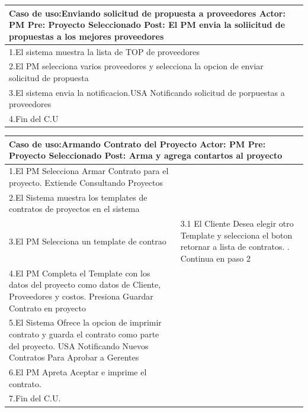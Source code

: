 \begin{longtable}{|p{}|p{}|}
    \hline
    \multicolumn{2}{|p{16cm}|}{
        \textbf{Caso de uso:}Enviando solicitud de propuesta a proveedores\newline
        \textbf{Actor:} PM\newline
        \textbf{Pre: }Proyecto Seleccionado\newline
        \textbf{Post:} El PM envia la soliicitud de propuestas a los mejores proveedores
    }\\
    \hline
    1.El sistema muestra la lista de TOP de proveedores & \\
    \hline
    2.El PM selecciona varios proveedores y selecciona la opcion de enviar solicitud de propuesta& \\
    \hline
    3.El sistema envia la notificacion.USA Notificando solicitud de porpuestas a proveedores& \\
    \hline
    4.Fin del C.U&\\
    \hline
\end{longtable}

\begin{longtable}{|p{}|p{}|}
    \hline
    \multicolumn{2}{|p{16cm}|}{
        \textbf{Caso de uso:}Armando Contrato del Proyecto \newline
        \textbf{Actor:} PM\newline
        \textbf{Pre: }Proyecto Seleccionado\newline
        \textbf{Post:} Arma y agrega contartos al proyecto
    }\\
    \hline
    1.El PM Selecciona Armar Contrato para el proyecto. Extiende Consultando Proyectos & \\
    \hline
    2.El Sistema muestra los templates de contratos de proyectos en el sistema& \\
    \hline
    3.El PM Selecciona un template de contrao& 3.1 El Cliente Desea elegir otro Template y selecciona el boton retornar a lista de contratos. \newline 3.2. Continua en paso 2 \\
    \hline
    4.El PM Completa el Template con los datos del proyecto como datos de Cliente, Proveedores y costos. Presiona Guardar Contrato en proyecto&\\
    \hline
    5.El Sistema Ofrece la opcion de imprimir contrato y guarda el contrato como parte del proyecto. USA Notificando Nuevos Contratos Para Aprobar a Gerentes&\\
    \hline
    6.El PM Apreta Aceptar e imprime el contrato.&\\
    \hline
    7.Fin del C.U. &\\
    \hline
\end{longtable}


